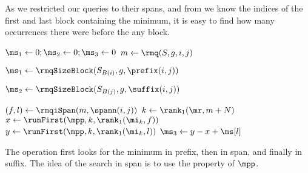 As we restricted our queries to their spans, and from \rmqiSpan{} we know the indices of the first and last block containing the minimum, it is easy to find how many occurrences there were before the any block.

\begin{algorithm}
\begin{algorithmic}
	\State $\ms_1 \gets 0; \ms_2 \gets 0; \ms_3 \gets 0$
	\State $m \gets \rmq(S, g, i, j)$
	
	 
		\State $\ms_1 \gets \rmqSizeBlock(S_{B(i)}, g, \prefix(i, j))$
	\EndIf
	
	 
		\State $\ms_2 \gets \rmqSizeBlock(S_{B(j)}, g, \suffix(i, j))$
	\EndIf

	\State $(f, l) \gets \rmqiSpan(m, \spann(i, j))$
	 
		\State $k \gets \rank_1(\mr, m + N)$ 
		\State $x \gets \runFirst(\mpp, k, \rank_1(\mi_k, f))$ 
		\State $y \gets \runFirst(\mpp, k, \rank_1(\mi_k, l))$ 
		\State $\ms_3 \gets y - x + \ms[l]$
	\EndIf
	\State {}
\EndFunction
\end{algorithmic}
\end{algorithm}

The operation \rmqSelect{} first looks for the minimum in prefix, then in span, and finally in suffix.
The idea of the search in span is to use the property of $\mpp$.

